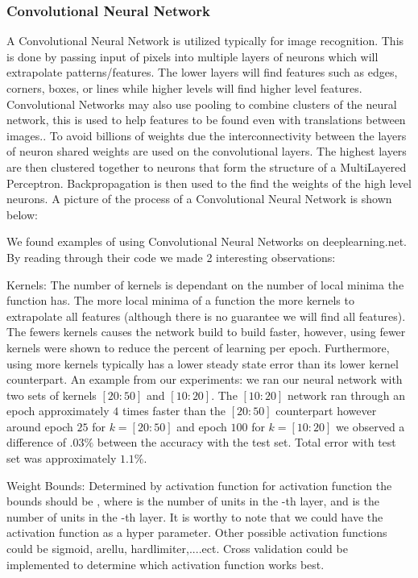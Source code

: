 \documentclass[11pt]{article}
\begin{document}
\subsubsection{Convolutional Neural Network}
A Convolutional Neural Network is utilized typically for image recognition.  This is done by passing input of pixels into multiple layers of neurons which will extrapolate patterns/features.  The lower layers will find features such as edges, corners, boxes, or lines while higher levels will find higher level features.  Convolutional Networks may also use pooling to combine clusters of the neural network, this is used to help features to be found even with translations between images..  
To avoid billions of weights due the interconnectivity between the layers of neuron shared weights are used on the convolutional layers.  The highest layers are then clustered together to neurons that form the structure of a MultiLayered Perceptron.  Backpropagation is then used to the find the weights of the high level neurons.  A picture of the process of a Convolutional Neural Network is shown below:

We found examples of using Convolutional Neural Networks on deeplearning.net.  By reading through their code we made 2 interesting observations:

Kernels:  The number of kernels is dependant on the number of local minima the function has.  The more local minima of a function the more kernels to extrapolate all features (although there is no guarantee we will find all features).  The fewers kernels causes the network build to build faster, however, using fewer kernels were shown to reduce the percent of learning per epoch.  Furthermore, using more kernels typically has a lower steady state error than its lower kernel counterpart.  An example from our experiments: we ran our neural network with two sets of kernels $[20:50]$ and $[10:20]$.  The $[10:20]$ network ran through an epoch approximately $4$ times faster than the $[20:50]$ counterpart however around epoch $25$ for $k=[20:50]$ and epoch $100$ for $k=[10:20]$ we observed a difference of $.03\%$ between the accuracy with the test set.  Total error with test set was approximately $1.1\%$.

Weight Bounds:  Determined by activation function for  activation function the bounds should be , where  is the number of units in the -th layer, and  is the number of units in the -th layer.  It is worthy to note that we could have the activation function as a hyper parameter. Other possible activation functions could be sigmoid, arellu, hardlimiter,....ect.  Cross validation could be implemented to determine which activation function works best.
\end{document}
